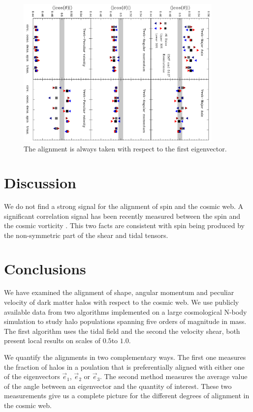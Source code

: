 \documentclass[useAMS,usenatbib]{mn2e}
\newcommand{\hMpc}{{\ifmmode{h^{-1}{\rm Mpc}}\else{$h^{-1}$Mpc }\fi}}
\begin{document}
\begin{figure}
\includegraphics[width=0.90\textwidth,angle=90]{all_cuts.pdf}
\caption{The alignment is always taken with respect to the first eigenvector.}
\end{figure}
\section{Discussion}
\label{sec:discussion}


We do not find a strong signal for the alignment of spin and the
cosmic web. A significant correlation signal has been recently
measured between the spin and the cosmic vorticity
\citep{Libeskind2013b,Laigle2013}. This two facts are consistent with
spin being produced by the non-symmetric part of the shear and tidal
tensors.  




\section{Conclusions}
\label{sec:conclusions}

We have examined the alignment of shape, angular momentum and peculiar
velocity of dark matter halos with respect to the cosmic web. We use
publicly available data from two algorithms implemented on a large
cosmological N-body simulation to study halo populations spanning five
orders of magnitude in mass. The first algorithm uses the tidal field
and the second the velocity shear, both present local results on
scales of $0.5$\hMpc to $1.0$\hMpc.  

We quantify the alignments in two complementary ways. The first one
measures the fraction of halos in a poulation that is preferentially
aligned with either one of the eigenvectors $\vec{e}_1$, $\vec{e}_2$
or $\vec{e}_3$. The second method measures the average value of the
angle between an eigenvector and the quantity of interest. These two
measurements give us a complete picture for the different degrees of
alignment in the cosmic web. 
\end{document}
